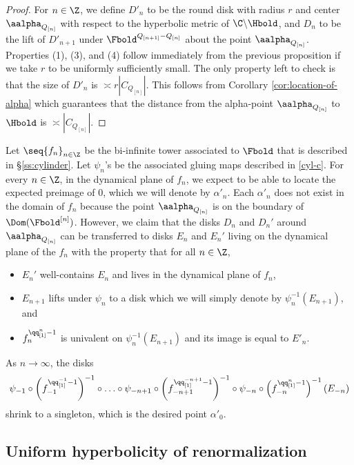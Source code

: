 \documentclass{amsart}
\begin{document}
\begin{proof}
    For $n \in \Z$, we define $D'_n$ to be the round disk with radius $r$ and center $\aalpha_{Q_{[n]}}$ with respect to the hyperbolic metric of $\C \backslash \Hbold$, and $D_n$ to be the lift of $D'_{n+1}$ under $\Fbold^{Q_{[n+1]}-Q_{[n]}}$ about the point $\aalpha_{Q_{[n]}}$.
    Properties (1), (3), and (4) follow immediately from the previous proposition if we take $r$ to be uniformly sufficiently small.
    The only property left to check is that the size of $D'_n$ is $\asymp r |C_{Q_{[n]}}|$.
    This follows from Corollary \ref{cor:location-of-alpha} which guarantees that the distance from the alpha-point $\aalpha_{Q_{[n]}}$ to $\Hbold$ is $\asymp |C_{Q_{[n]}}|$.
\end{proof}

Let $\seq{f_n}_{n \in \Z}$ be the bi-infinite tower associated to $\Fbold$ that is described in \S\ref{ss:cylinder}.
Let $\psi_n$'s be the associated gluing maps described in \ref{cyl-c}.
For every $n \in \Z$, in the dynamical plane of $f_n$, we expect to be able to locate the expected preimage of $0$, which we will denote by $\alpha'_n$.
Each $\alpha'_n$ does not exist in the domain of $f_n$ because the point $\aalpha_{Q_{[n]}}$ is on the boundary of $\Dom(\Fbold^{[n]})$.
However, we claim that the disks $D_n$ and $D_n'$ around $\aalpha_{Q_{[n]}}$ can be transferred to disks $E_n$ and $E_n'$ living on the dynamical plane of the $f_n$ with the property that for all $n \in \Z$,
\begin{itemize}
    \item $E_n'$ well-contains $E_n$ and lives in the dynamical plane of $f_n$,
    \item $E_{n+1}$ lifts under $\psi_n$ to a disk which we will simply denote by $\psi_{n}^{-1}(E_{n+1})$, and 
    \item $f_n^{\qq^n_{[1]}-1}$ is univalent on $\psi_{n}^{-1}(E_{n+1})$ and its image is equal to $E'_n$.
\end{itemize}
As $n \to \infty$, the disks
\[
    \psi_{-1} \circ \left( f_{-1}^{\qq^{-1}_{[1]}-1} \right)^{-1} \circ \ldots \circ \psi_{-n+1} \circ \left( f_{-n+1}^{\qq^{-n+1}_{[1]}-1} \right)^{-1}\circ \psi_{-n} \circ \left( f_{-n}^{\qq^n_{[1]}-1} \right)^{-1}(E_{-n})
\]
shrink to a singleton, which is the desired point $\alpha'_0$.

\subsection{Uniform hyperbolicity of renormalization}
\label{ss:uniform-hyperbolicity}
\end{document}
